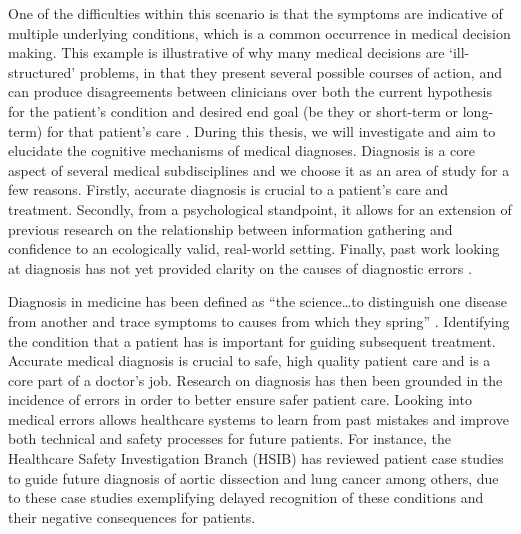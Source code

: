 \documentclass[a4paper, nobind]{templates/ociamthesis}
\begin{document}
One of the difficulties within this scenario is that the symptoms are indicative of multiple underlying conditions, which is a common occurrence in medical decision making. This example is illustrative of why many medical decisions are `ill-structured' problems, in that they present several possible courses of action, and can produce disagreements between clinicians over both the current hypothesis for the patient's condition and desired end goal (be they or short-term or long-term) for that patient's care \autocite{jonassen_instructional_1997}. During this thesis, we will investigate and aim to elucidate the cognitive mechanisms of medical diagnoses. Diagnosis is a core aspect of several medical subdisciplines and we choose it as an area of study for a few reasons. Firstly, accurate diagnosis is crucial to a patient's care and treatment. Secondly, from a psychological standpoint, it allows for an extension of previous research on the relationship between information gathering and confidence to an ecologically valid, real-world setting. Finally, past work looking at diagnosis has not yet provided clarity on the causes of diagnostic errors \autocite{van_den_berge_cognitive_2013,norman_etiology_2014,restrepo_annals_2020}.

\hfill\break
Diagnosis in medicine has been defined as ``the science\ldots to distinguish one disease from another and trace symptoms to causes from which they spring'' \autocite{fenwick_medical_1891}. Identifying the condition that a patient has is important for guiding subsequent treatment. Accurate medical diagnosis is crucial to safe, high quality patient care and is a core part of a doctor's job. Research on diagnosis has then been grounded in the incidence of errors in order to better ensure safer patient care. Looking into medical errors allows healthcare systems to learn from past mistakes and improve both technical and safety processes for future patients. For instance, the Healthcare Safety Investigation Branch (HSIB) has reviewed patient case studies to guide future diagnosis of aortic dissection \autocite{hsib_investigation_2021} and lung cancer \autocite{hsib_investigation_2022} among others, due to these case studies exemplifying delayed recognition of these conditions and their negative consequences for patients.
\end{document}
